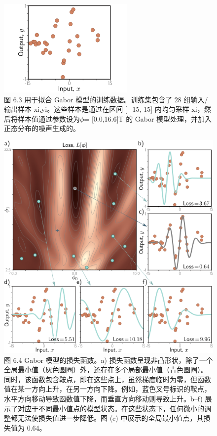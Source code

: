 \begin{figure}[ht!]
\centering
\includegraphics[width=0.7\linewidth]{png/chapter6/TrainGaborData.png}
\caption{图 6.3 用于拟合 Gabor 模型的训练数据。训练集包含了 28 组输入/输出样本 {xi,yi}。这些样本是通过在区间 [−15, 15] 内均匀采样 xi，然后将样本值通过参数设为\(\phi\)= [0.0,16.6]T 的 Gabor 模型处理，并加入正态分布的噪声生成的。}
\end{figure}

\begin{figure}[ht!]
\centering
\includegraphics[width=0.7\linewidth]{png/chapter6/TrainGaborMin.png}
\caption{图 6.4 Gabor 模型的损失函数。a) 损失函数呈现非凸形状，除了一个全局最小值（灰色圆圈）外，还存在多个局部最小值（青色圆圈）。同时，该函数包含鞍点，即在这些点上，虽然梯度临时为零，但函数值在某一方向上升，在另一方向下降。例如，蓝色叉号标识的鞍点，水平方向移动导致函数值下降，而垂直方向移动则导致上升。b–f) 展示了对应于不同最小值点的模型状态。在这些状态下，任何微小的调整都无法使损失值进一步降低。图 (c) 中展示的全局最小值点，其损失值为 0.64。}
\end{figure}

